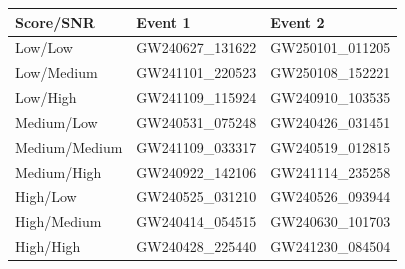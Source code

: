 \par\medskip
\noindent\begin{minipage}{\columnwidth}
\begin{center}
\renewcommand{\arraystretch}{1.08}
\begin{tabular}{@{}lll@{}}
\toprule
Score/SNR & Event 1 & Event 2 \\
\midrule
Low/Low & GW240627\_131622 & GW250101\_011205 \\
Low/Medium & GW241101\_220523 & GW250108\_152221 \\
Low/High & GW241109\_115924 & GW240910\_103535 \\
Medium/Low & GW240531\_075248 & GW240426\_031451 \\
Medium/Medium & GW241109\_033317 & GW240519\_012815 \\
Medium/High & GW240922\_142106 & GW241114\_235258 \\
High/Low & GW240525\_031210 & GW240526\_093944 \\
High/Medium & GW240414\_054515 & GW240630\_101703 \\
High/High & GW240428\_225440 & GW241230\_084504 \\
\bottomrule
\end{tabular}
\end{center}
\tablecredit
\end{minipage}
\par\medskip
